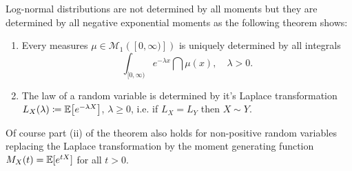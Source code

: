 Log-normal distributions are not determined by all moments but they are determined by all negative exponential moments as the following theorem shows:
\begin{lSatzHerz}
\begin{theorem}\label{cor_distributions_1}
	\begin{enumerate}[label=(\roman*)]
		\item Every measures $\mu \in \mathcal M_1([0,\infty)])$ is uniquely determined by all integrals $$\int_{[0,\infty)} e^{-\lambda x}\dint \mu(x),\quad \lambda>0.$$
		\item The law of a \underline{} random variable is determined by it's Laplace transformation $L_X(\lambda) \coloneqq \mathbb{E} \big[ e^{- \lambda X} \big]$, $\lambda \geq 0$, i.e. if $L_X=L_Y$ then $X\sim Y$.
	\end{enumerate}
\end{theorem}
\end{lSatzHerz}
Of course part (ii) of the theorem also holds for non-positive random variables replacing the Laplace transformation by the moment generating function $M_X(t)=\mathbb{E}[e^{tX}]$ for all $t>0$.
